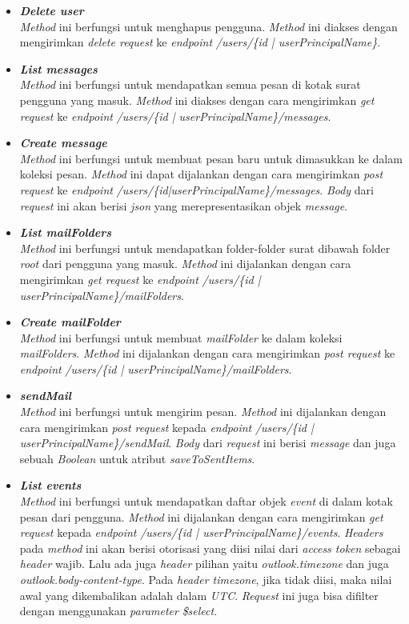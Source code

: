 \begin{itemize}
	\item \textbf{\textit{Delete user}}\\
	\textit{Method} ini berfungsi untuk menghapus pengguna. \textit{Method} ini diakses dengan mengirimkan \textit{delete request} ke \textit{endpoint} \textit{/users/\{id | userPrincipalName\}}. 
	\item \textbf{\textit{List messages}}\\
	\textit{Method} ini berfungsi untuk mendapatkan semua pesan di kotak surat pengguna yang masuk. \textit{Method} ini diakses dengan cara mengirimkan \textit{get request} ke \textit{endpoint} \textit{/users/\{id | userPrincipalName\}/messages}. 
	\item \textbf{\textit{Create message}}\\
	\textit{Method} ini berfungsi untuk membuat pesan baru untuk dimasukkan ke dalam koleksi pesan. \textit{Method} ini dapat dijalankan dengan cara mengirimkan \textit{post request} ke \textit{endpoint} \textit{/users/\{id|userPrincipalName\}/messages}. \textit{Body} dari \textit{request} ini akan berisi \textit{json} yang merepresentasikan objek \textit{message}. 
	\item \textbf{\textit{List mailFolders}}\\
	\textit{Method} ini berfungsi untuk mendapatkan folder-folder surat dibawah folder \textit{root} dari pengguna yang masuk. \textit{Method} ini dijalankan dengan cara mengirimkan \textit{get request} ke \textit{endpoint} \textit{/users/\{id | userPrincipalName\}/mailFolders}.
	\item \textbf{\textit{Create mailFolder}}\\
	\textit{Method} ini berfungsi untuk membuat \textit{mailFolder} ke dalam koleksi \textit{mailFolders}. \textit{Method} ini dijalankan dengan cara mengirimkan \textit{post request} ke \textit{endpoint} \textit{/users/\{id | userPrincipalName\}/mailFolders}. 
	\item \textbf{\textit{sendMail}}\\
	\textit{Method} ini berfungsi untuk mengirim pesan. \textit{Method} ini dijalankan dengan cara mengirimkan \textit{post request} kepada \textit{endpoint} \textit{/users/\{id | userPrincipalName\}/sendMail}. \textit{Body} dari \textit{request} ini berisi \textit{message} dan juga sebuah \textit{Boolean} untuk atribut \textit{saveToSentItems}.
	\item \textbf{\textit{List events}}\\
	\textit{Method} ini berfungsi untuk mendapatkan daftar objek \textit{event} di dalam kotak pesan dari pengguna. \textit{Method} ini dijalankan dengan cara mengirimkan \textit{get request} kepada \textit{endpoint} \textit{/users/\{id | userPrincipalName\}/events}. \textit{Headers} pada \textit{method} ini akan berisi otorisasi yang diisi nilai dari \textit{access token} sebagai \textit{header} wajib. Lalu ada juga \textit{header} pilihan yaitu \textit{outlook.timezone} dan juga \textit{outlook.body-content-type}. Pada \textit{header timezone}, jika tidak diisi, maka nilai awal yang dikembalikan adalah dalam \textit{UTC}. \textit{Request} ini juga bisa difilter dengan menggunakan \textit{parameter} \textit{\$select}. 

\end{itemize}
